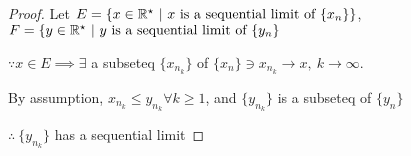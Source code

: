\begin{thm*}
\begin{enumerate}
	\begin{proof}
		Let $E = \{x \in \mathbb{R}^\star ~|~ x \text{ is a sequential limit of } \{x_n\}\}$, $F = \{y \in \mathbb{R}^\star ~|~ y \text{ is a sequential limit of } \{y_n\}$
		
		$\because x \in E \implies \exists$ a subseteq $\{x_{n_k}\}$ of $\{x_n\} \ni x_{n_k} \rightarrow x,~k \rightarrow \infty$.
		
		By assumption, $x_{n_k} \leq y_{n_k} \forall k \geq 1$, and $\{y_{n_k}\}$ is a subseteq of $\{y_n\}$
		
		$\therefore~\{y_{n_k}\}$ has a sequential limit  
	\end{proof}
	 
	\end{enumerate}
\end{thm*}





















